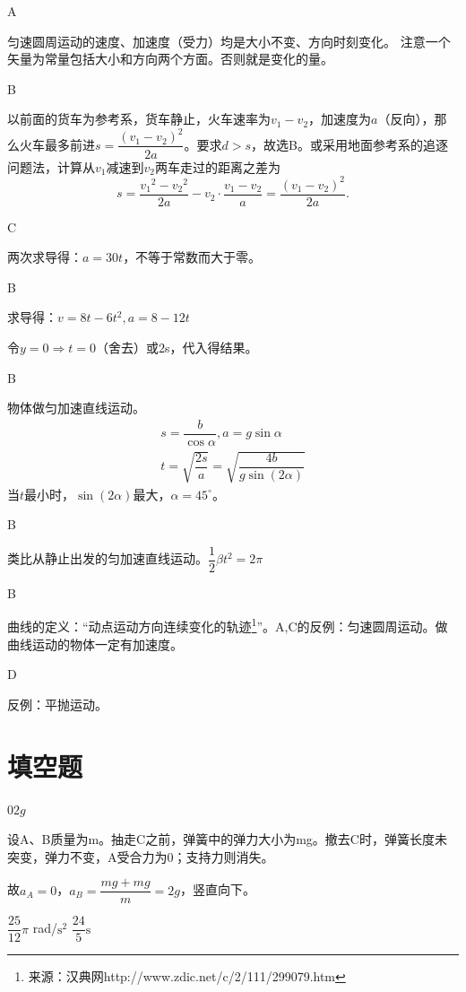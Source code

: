 \documentclass[b5paper,opensource,sourcefont,parskip]{qyxf-book}
\begin{document}
A

\solve 匀速圆周运动的速度、加速度（受力）均是大小不变、方向时刻变化。
注意一个矢量为常量包括大小和方向两个方面。否则就是变化的量。

B

\solve 以前面的货车为参考系，货车静止，火车速率为$v_1-v_2$，加速度为$a$（反向），那么火车最多前进$s=\dfrac{{(v_1-v_2)}^2}{2a}$。要求$d>s$，故选B。或采用地面参考系的追逐问题法，计算从$v_1\text{减速到}v_2$两车走过的距离之差为
\[
s=\dfrac{{v_1}^2-{v_2}^2}{2a}-v_2\cdot \dfrac{v_1-v_2}{a}=\dfrac{{(v_1-v_2)}^2}{2a}.
\]

C

\solve 两次求导得：$a=30t$，不等于常数而大于零。

B

\solve 求导得：$v=8t-6t^2,a=8-12t$

令$y=0\Rightarrow t=0\text{（舍去）或}2$s，代入得结果。

B

\solve 物体做匀加速直线运动。
\begin{gather*}
s=\dfrac{b}{\cos\alpha},a=g\sin\alpha\\
t=\sqrt{\dfrac{2s}{a}}=\sqrt{\dfrac{4b}{g\sin(2\alpha)}}
\end{gather*}
当$t$最小时，$\sin(2\alpha)$最大，$\alpha=45^\circ$。

B

\solve 类比从静止出发的匀加速直线运动。$\dfrac{1}{2}\beta t^2=2\pi$

B

\solve 曲线的定义：“动点运动方向连续变化的轨迹\footnote{来源：汉典网http://www.zdic.net/c/2/111/299079.htm}”。A,C的反例：匀速圆周运动。做曲线运动的物体一定有加速度。

D

\solve 反例：平抛运动。

\section{填空题}
$0$\qquad$2g$

\solve 设A、B质量为m。抽走C之前，弹簧中的弹力大小为mg。撤去C时，弹簧长度未突变，弹力不变，A受合力为0；支持力则消失。

故$a_A=0$，$a_B=\dfrac{mg+mg}{m}=2g$，竖直向下。

$\dfrac{25}{12}\pi$ rad/$\textrm{s}^2$ \qquad$\dfrac{24}{5} \textrm{s}$
\end{document}
